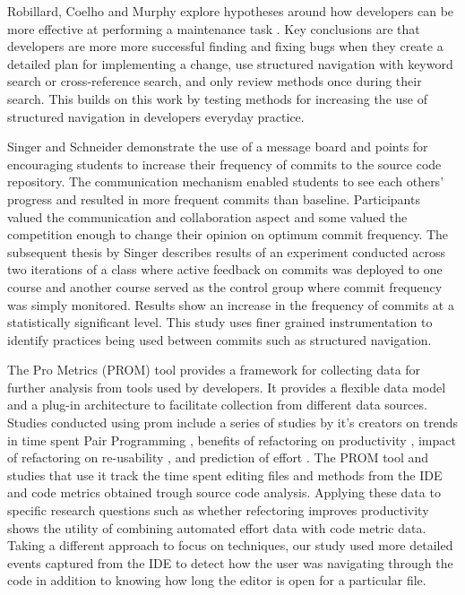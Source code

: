 \documentclass{sig-alternate}
\begin{document}
Robillard, Coelho and Murphy explore hypotheses around how developers can be more effective at performing a maintenance task \cite{wbsnipes:Robillard2004How}.  Key conclusions are that developers are more more successful finding and fixing bugs when they create a detailed plan for implementing a change, use structured navigation with keyword search or cross-reference search, and only review methods once during their search.  This builds on this work by testing methods for increasing the use of structured navigation in developers everyday practice.

Singer and Schneider demonstrate the use of a message board and points for encouraging students to increase their frequency of commits to the source code repository.\cite{Singer2012It}  The communication mechanism enabled students to see each others' progress and resulted in more frequent commits than baseline.  Participants valued the communication and collaboration aspect and some valued the competition enough to change their opinion on optimum commit frequency.  The subsequent thesis by Singer \cite{Singer2013a} describes results of an experiment conducted across two iterations of a class where active feedback on commits was deployed to one course and another course served as the control group where commit frequency was simply monitored.  Results show an increase in the frequency of commits at a statistically significant level.  This study uses finer grained instrumentation to identify practices being used between commits such as structured navigation.

The Pro Metrics (PROM) tool provides a framework for collecting data for further analysis from tools used by developers.\cite{Coman2009Casestudy}  It provides a flexible data model and a plug-in architecture to facilitate collection from different data sources.  Studies conducted using prom include a series of studies by it's creators on trends in time spent Pair Programming \cite{Coman2008Investigating}, benefits of refactoring on productivity \cite{Moser2008Case}, impact of refactoring on re-usability \cite{Moser2006Does}, and prediction of effort \cite{Abrahamsson2007Effort}.  The PROM tool and studies that use it track the time spent editing files and methods from the IDE and code metrics obtained trough source code analysis.  Applying these data to specific research questions such as whether refectoring improves productivity \cite{Moser2008Case} shows the utility of combining automated effort data with code metric data.  Taking a different approach to focus on techniques, our study used more detailed events captured from the IDE  to detect how the user was navigating through the code in addition to knowing how long the editor is open for a particular file.
\end{document}
